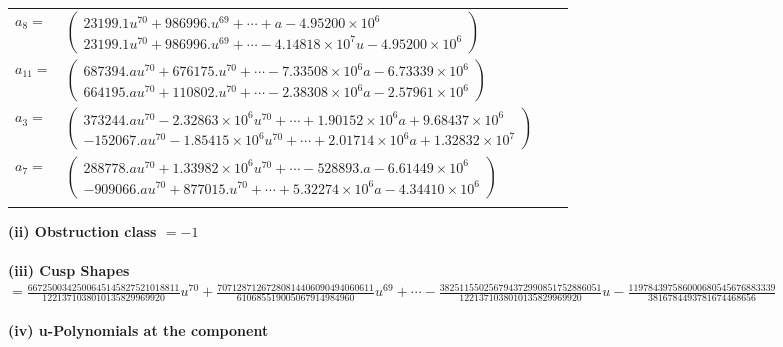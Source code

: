 \documentclass[1p]{elsarticle_modified}
\theoremstyle{definition}
\begin{document}
\begin{tabular}{m{7pt} m{180pt} m{7pt} m{180pt} }
\flushright $a_{8}=$&$\begin{pmatrix}23199.1 u^{70}+986996. u^{69}+\cdots+a-4.95200\times10^{6}\\23199.1 u^{70}+986996. u^{69}+\cdots-4.14818\times10^{7} u-4.95200\times10^{6}\end{pmatrix}$ \\
\flushright $a_{11}=$&$\begin{pmatrix}687394. a u^{70}+676175. u^{70}+\cdots-7.33508\times10^{6} a-6.73339\times10^{6}\\664195. a u^{70}+110802. u^{70}+\cdots-2.38308\times10^{6} a-2.57961\times10^{6}\end{pmatrix}$ \\
\flushright $a_{3}=$&$\begin{pmatrix}373244. a u^{70}-2.32863\times10^{6} u^{70}+\cdots+1.90152\times10^{6} a+9.68437\times10^{6}\\-152067. a u^{70}-1.85415\times10^{6} u^{70}+\cdots+2.01714\times10^{6} a+1.32832\times10^{7}\end{pmatrix}$ \\
\flushright $a_{7}=$&$\begin{pmatrix}288778. a u^{70}+1.33982\times10^{6} u^{70}+\cdots-528893. a-6.61449\times10^{6}\\-909066. a u^{70}+877015. u^{70}+\cdots+5.32274\times10^{6} a-4.34410\times10^{6}\end{pmatrix}$\\&\end{tabular}
\flushleft \textbf{(ii) Obstruction class $= -1$}\\~\\
\flushleft \textbf{(iii) Cusp Shapes $= \frac{6672500342500645145827521018811}{1221371038010135829969920} u^{70}+\frac{70712871267280814406090494060611}{610685519005067914984960} u^{69}+\cdots-\frac{382511550256794372990851752886051}{1221371038010135829969920} u-\frac{119784397586000680545676883339}{3816784493781674468656}$}\\~\\
\newpage\renewcommand{\arraystretch}{1}
\flushleft \textbf{(iv) u-Polynomials at the component}\newline \\
\end{document}
